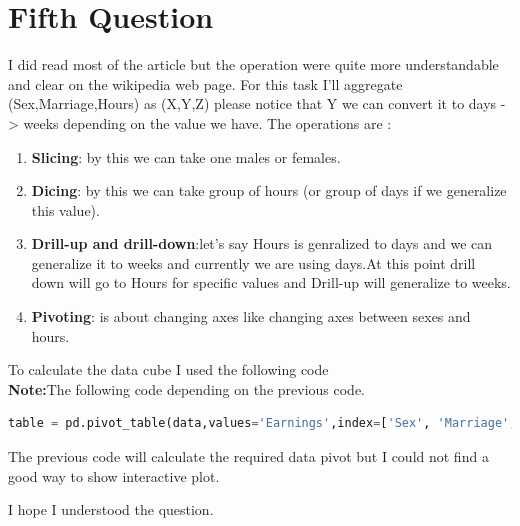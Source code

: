\documentclass{article}
\begin{document}
\section*{Fifth Question}
I did read most of the article but the operation were quite more understandable and clear on the wikipedia web page.
For this task I'll aggregate (Sex,Marriage,Hours) as (X,Y,Z) please notice that Y we can convert it to days -> weeks depending on the value we have.
The operations are : 
\begin{enumerate}
\item \textbf{Slicing}: by this we can take one males or females.
\item \textbf{Dicing}: by this we can take group of hours (or group of days if we generalize this value).
\item \textbf{Drill-up and drill-down}:let's say Hours is genralized to days and we can generalize it to weeks and currently we are using days.At this point drill down will go to Hours for specific values and Drill-up will generalize to weeks.
\item \textbf{Pivoting}: is about changing axes like changing axes between sexes and hours.
\end{enumerate}
To calculate the data cube I used the following code \\ 
\textbf{Note:}The following code depending on the previous code.
\begin{lstlisting}[language=Python]
table = pd.pivot_table(data,values='Earnings',index=['Sex', 'Marriage','Hours'],aggfunc=np.mean)
\end{lstlisting}
The previous code will calculate the required data pivot but I could not find a good way to show interactive plot.

I hope I understood the question.
\end{document}
